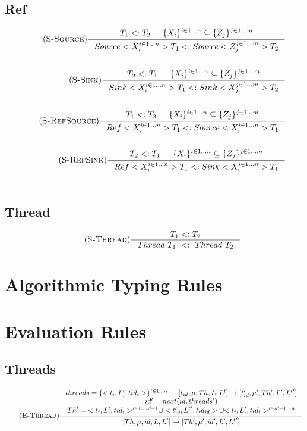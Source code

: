 \documentclass[12pt]{article}
\begin{document}
\subsection{Ref}
\begin{align*}
    \tag{\textsc{S-Source}}
    \inference[]{T_1 <: T_2 & \{X_i\}^{i\in 1...n} \subseteq   \{Z_j\}^{j\in 1...m}}{Source<X_i^{i\in 1...n}>T_1 <: Source<Z_j^{j\in 1...m}>T_2}
    \\
    \\
    \tag{\textsc{S-Sink}}
    \inference[]{T_2 <: T_1 & \{X_i\}^{i\in 1...n} \subseteq   \{Z_j\}^{j\in 1...m}}{Sink<X_i^{i\in 1...n}>T_1 <: Sink<X_j^{j\in 1...m}>T_2}
    \\
    \\
    \tag{\textsc{S-RefSource}}
    \inference[]{T_1<:T_2 & \{X_i\}^{i\in 1...n} \subseteq   \{Z_j\}^{j\in 1...m}}{
    Ref<X_i^{i\in 1...n}>T_1 <: Source<X_i^{i\in 1...n}>T_1}
    \\
    \\
    \tag{\textsc{S-RefSink}}
    \inference[]{T_2<:T_1 & \{X_i\}^{i\in 1...n} \subseteq   \{Z_j\}^{j\in 1...m}}
    {Ref<X_i^{i\in 1...n}>T_1 <: Sink<X_i^{i\in 1...n}>T_1}
    \\
    \\
\end{align*}
\subsection{Thread}
\begin{align*}
    \tag {\textsc{S-Thread}}
    \inference[]{T_1 <: T_2}{ Thread~T_1~<:~Thread~T_2}
\end{align*}

\section{Algorithmic Typing Rules}


\section{Evaluation Rules}

\subsection{Threads}
\begin{align*}
    \tag{\textsc{E-Thread}}
    \inference[]{threads = \{<t_i,L^t_i,tid_i>\}^{i\in 1...n} & [t_{id},\mu,Th,L,L^t] -> [t_{id}',\mu',Th',L',{L^t}']\\
     id' = next(id,threads') \\ Th' = {<t_i,L_i^t,tid_i>^{i\in 1...id-1}}\cup<t_{id}',{L^t}',tid_{id}>\cup{<t_i,L_i^t,tid_i>^{i\in id+1...n}}}{[Th,\mu,id,L,L^t]->[Th',\mu',id',L',{L^t}']}
    \\
    \\
\end{align*}
\end{document}
